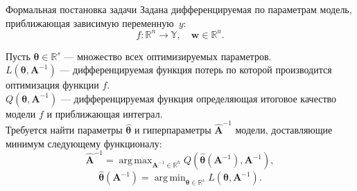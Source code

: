 \documentclass[10pt,pdf,utf8,russian,aspectratio=169]{beamer}
\DeclareMathOperator*{\argmin}{arg\,min}
\DeclareMathOperator*{\argmax}{arg\,max}
\begin{document}
\begin{frame}{Формальная постановка задачи}
Задана дифференцируемая по параметрам модель, приближающая зависимую переменную~$y$:
\[
	f:\mathbb{R}^n \to \mathbb{Y}, \quad \mathbf{w} \in \mathbb{R}^u.
\]

Пусть $\boldsymbol{\theta} \in \mathbb{R}^s$ --- множество всех оптимизируемых параметров.\\
$L(\boldsymbol{\theta}, \mathbf{A}^{-1})$ ---  дифференцируемая функция потерь  по которой производится оптимизация функции ${f}$. \\
$Q(\boldsymbol{\theta}, \mathbf{A}^{-1})$ ---  дифференцируемая функция определяющая итоговое качество модели ${f}$ и приближающая интеграл.\\

Требуется найти параметры $\hat{\boldsymbol{\theta}}$ и гиперпараметры $\hat{\mathbf{A}}^{-1}$ модели, доставляющие минимум следующему функционалу:
\[
\hat{\mathbf{A}}^{-1} = \argmax_{\mathbf{A}^{-1} \in \mathbb{R}^h} Q(\hat{\boldsymbol{\theta}}(\mathbf{A}^{-1}), \mathbf{A}^{-1}),
\]
\[
	\hat{\boldsymbol{\theta}}(\mathbf{A}^{-1}) =  \argmin_{\boldsymbol{\theta} \in \mathbb{R}^s} L(\boldsymbol{\theta}, \mathbf{A}^{-1}).
\]
\end{frame}

\end{document}

